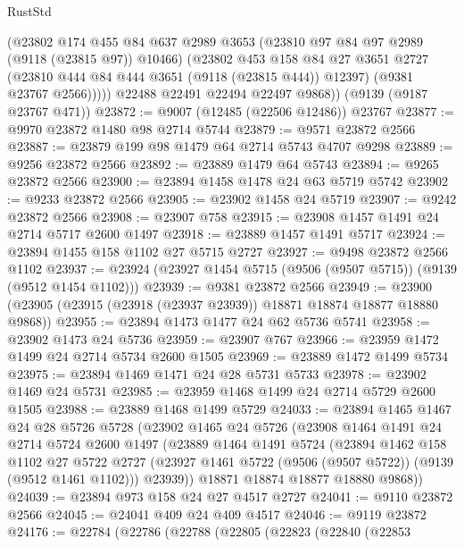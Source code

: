\begin{lexlean}{RustStd}
\begin{coremodule}
            (@23802
              @174
              @455
              @84
              @637
              @2989
              @3653
              (@23810 @97 @84 @97 @2989 (@9118 (@23815 @97)) @10466)
              (@23802
                @453
                @158
                @84
                @27
                @3651
                @2727
                (@23810 @444 @84 @444 @3651 (@9118 (@23815 @444)) @12397)
                (@9381 @23767 @2566)))))
        @22488
        @22491
        @22494
        @22497
        @9868))
    (@9139 (@9187 @23767 @471))
@23872 := @9007 (@12485 (@22506 @12486)) @23767
@23877 := @9970 @23872 @1480 @98 @2714 @5744
@23879 := @9571 @23872 @2566
@23887 := @23879 @199 @98 @1479 @64 @2714 @5743 @4707 @9298
@23889 := @9256 @23872 @2566
@23892 := @23889 @1479 @64 @5743
@23894 := @9265 @23872 @2566
@23900 := @23894 @1458 @1478 @24 @63 @5719 @5742
@23902 := @9233 @23872 @2566
@23905 := @23902 @1458 @24 @5719
@23907 := @9242 @23872 @2566
@23908 := @23907 @758
@23915 := @23908 @1457 @1491 @24 @2714 @5717 @2600 @1497
@23918 := @23889 @1457 @1491 @5717
@23924 := @23894 @1455 @158 @1102 @27 @5715 @2727
@23927 := @9498 @23872 @2566 @1102
@23937 := @23924 (@23927 @1454 @5715 (@9506 (@9507 @5715)) (@9139 (@9512 @1454 @1102)))
@23939 := @9381 @23872 @2566
@23949 := @23900 (@23905 (@23915 (@23918 (@23937 @23939)) @18871 @18874 @18877 @18880 @9868))
@23955 := @23894 @1473 @1477 @24 @62 @5736 @5741
@23958 := @23902 @1473 @24 @5736
@23959 := @23907 @767
@23966 := @23959 @1472 @1499 @24 @2714 @5734 @2600 @1505
@23969 := @23889 @1472 @1499 @5734
@23975 := @23894 @1469 @1471 @24 @28 @5731 @5733
@23978 := @23902 @1469 @24 @5731
@23985 := @23959 @1468 @1499 @24 @2714 @5729 @2600 @1505
@23988 := @23889 @1468 @1499 @5729
@24033 := @23894
    @1465
    @1467
    @24
    @28
    @5726
    @5728
    (@23902
      @1465
      @24
      @5726
      (@23908
        @1464
        @1491
        @24
        @2714
        @5724
        @2600
        @1497
        (@23889
          @1464
          @1491
          @5724
          (@23894
            @1462
            @158
            @1102
            @27
            @5722
            @2727
            (@23927 @1461 @5722 (@9506 (@9507 @5722)) (@9139 (@9512 @1461 @1102)))
            @23939))
        @18871
        @18874
        @18877
        @18880
        @9868))
@24039 := @23894 @973 @158 @24 @27 @4517 @2727
@24041 := @9110 @23872 @2566
@24045 := @24041 @409 @24 @409 @4517
@24046 := @9119 @23872
@24176 := @22784
    (@22786
      (@22788
        (@22805
          (@22823
            (@22840
              (@22853

\end{coremodule}
\end{lexlean}
